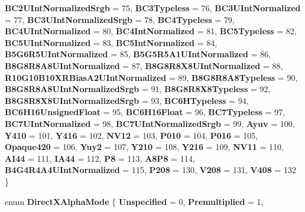 \begin{DoxyCompactItemize}
{\bfseries B\+C2\+U\+Int\+Normalized\+Srgb} = 75, 
\newline
{\bfseries B\+C3\+Typeless} = 76, 
{\bfseries B\+C3\+U\+Int\+Normalized} = 77, 
{\bfseries B\+C3\+U\+Int\+Normalized\+Srgb} = 78, 
{\bfseries B\+C4\+Typeless} = 79, 
\newline
{\bfseries B\+C4\+U\+Int\+Normalized} = 80, 
{\bfseries B\+C4\+Int\+Normalized} = 81, 
{\bfseries B\+C5\+Typeless} = 82, 
{\bfseries B\+C5\+U\+Int\+Normalized} = 83, 
\newline
{\bfseries B\+C5\+Int\+Normalized} = 84, 
{\bfseries B5\+G6\+R5\+U\+Int\+Normalized} = 85, 
{\bfseries B5\+G5\+R5\+A1\+U\+Int\+Normalized} = 86, 
{\bfseries B8\+G8\+R8\+A8\+U\+Int\+Normalized} = 87, 
\newline
{\bfseries B8\+G8\+R8\+X8\+U\+Int\+Normalized} = 88, 
{\bfseries R10\+G10\+B10\+X\+R\+Bias\+A2\+U\+Int\+Normalized} = 89, 
{\bfseries B8\+G8\+R8\+A8\+Typeless} = 90, 
{\bfseries B8\+G8\+R8\+A8\+U\+Int\+Normalized\+Srgb} = 91, 
\newline
{\bfseries B8\+G8\+R8\+X8\+Typeless} = 92, 
{\bfseries B8\+G8\+R8\+X8\+U\+Int\+Normalized\+Srgb} = 93, 
{\bfseries B\+C6\+H\+Typeless} = 94, 
{\bfseries B\+C6\+H16\+Unsigned\+Float} = 95, 
\newline
{\bfseries B\+C6\+H16\+Float} = 96, 
{\bfseries B\+C7\+Typeless} = 97, 
{\bfseries B\+C7\+U\+Int\+Normalized} = 98, 
{\bfseries B\+C7\+U\+Int\+Normalized\+Srgb} = 99, 
\newline
{\bfseries Ayuv} = 100, 
{\bfseries Y410} = 101, 
{\bfseries Y416} = 102, 
{\bfseries N\+V12} = 103, 
\newline
{\bfseries P010} = 104, 
{\bfseries P016} = 105, 
{\bfseries Opaque420} = 106, 
{\bfseries Yuy2} = 107, 
\newline
{\bfseries Y210} = 108, 
{\bfseries Y216} = 109, 
{\bfseries N\+V11} = 110, 
{\bfseries A\+I44} = 111, 
\newline
{\bfseries I\+A44} = 112, 
{\bfseries P8} = 113, 
{\bfseries A8\+P8} = 114, 
{\bfseries B4\+G4\+R4\+A4\+U\+Int\+Normalized} = 115, 
\newline
{\bfseries P208} = 130, 
{\bfseries V208} = 131, 
{\bfseries V408} = 132
 \}
\item 
\mbox{\label{namespace_windows_1_1_graphics_1_1_direct_x_af123b0bc9a4738d81ccfc0ea3154e8d2}} 
enum {\bfseries Direct\+X\+Alpha\+Mode} \{ \newline
{\bfseries Unspecified} = 0, 
{\bfseries Premultiplied} = 1, 

\end{DoxyCompactItemize}
